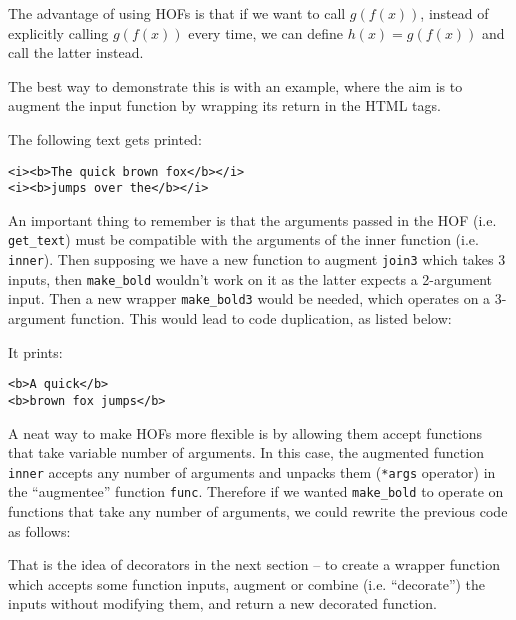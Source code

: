 \documentclass[a4paper]{article}
\begin{document}
The advantage of using HOFs is that if we want to call $g(f(x))$, instead of explicitly calling $g(f(x))$ every time, we can define $h(x) = g(f(x))$ and call the latter instead. 

The best way to demonstrate this is with an example, where the aim is to augment the input function by wrapping its return in the  HTML tags.


The following text gets printed:
\begin{verbatim}
<i><b>The quick brown fox</b></i>
<i><b>jumps over the</b></i>
\end{verbatim}
An important thing to remember is that the arguments passed in the HOF (i.e. \texttt{get\_text}) must be compatible with the arguments of the inner function (i.e. \texttt{inner}). Then supposing we have a new function to augment \texttt{join3} which takes 3 inputs, then \texttt{make\_bold} wouldn't work on it as the latter expects a 2-argument input. Then a new wrapper \texttt{make\_bold3} would be needed, which operates on a 3-argument function. This would lead to code duplication, as listed below:

It prints:
\begin{verbatim}
<b>A quick</b>
<b>brown fox jumps</b>
\end{verbatim}

A neat way to make HOFs more flexible is by allowing them accept functions that take variable number of arguments. In this case, the augmented function \texttt{inner} accepts any number of arguments and unpacks them (\texttt{*args} operator) in the ``augmentee'' function \texttt{func}. Therefore if we wanted \texttt{make\_bold} to operate on functions that take any number of arguments, we could rewrite the previous code as follows:


That is the idea of decorators in the next section -- to create a wrapper function which accepts some function inputs, augment or combine (i.e. ``decorate'') the inputs without modifying them, and return a new decorated function.
\end{document}
